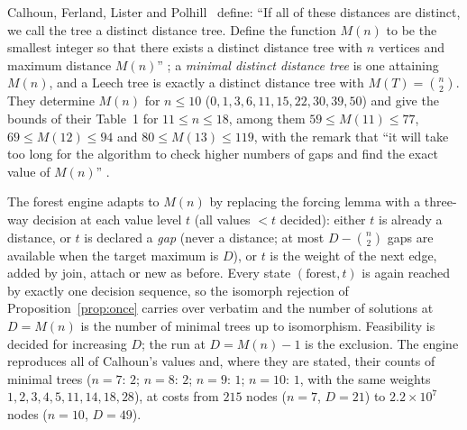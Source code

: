 \documentclass[11pt,a4paper]{article}
\theoremstyle{plain}
\theoremstyle{remark}
\newcommand{\bin}[2]{\binom{#1}{#2}}
\begin{document}
Calhoun, Ferland, Lister and Polhill~\cite{Calhoun2007} define: ``If all of
these distances are distinct, we call the tree a distinct distance tree.  Define
the function $M(n)$ to be the smallest integer so that there exists a distinct
distance tree with $n$ vertices and maximum distance $M(n)$'' \cite[p.~33]{Calhoun2007};
a \emph{minimal distinct distance tree} is one attaining $M(n)$, and a Leech tree
is exactly a distinct distance tree with $M(T)=\bin n2$.  They determine
$M(n)$ for $n\le 10$ ($0,1,3,6,11,15,22,30,39,50$) and give the bounds of their
Table~1 for $11\le n\le 18$, among them $59\le M(11)\le 77$, $69\le M(12)\le 94$
and $80\le M(13)\le 119$, with the remark that ``it will take too long for the
algorithm to check higher numbers of gaps and find the exact value of $M(n)$''
\cite[p.~44]{Calhoun2007}.

The forest engine adapts to $M(n)$ by replacing the forcing lemma with a
three-way decision at each value level $t$ (all values $<t$ decided): either $t$
is already a distance, or $t$ is declared a \emph{gap} (never a distance; at most
$D-\bin n2$ gaps are available when the target maximum is $D$), or $t$ is the
weight of the next edge, added by join, attach or new as before.  Every state
$(\text{forest},t)$ is again reached by exactly one decision sequence, so the
isomorph rejection of Proposition~\ref{prop:once} carries over verbatim and the
number of solutions at $D=M(n)$ is the number of minimal trees up to isomorphism.
Feasibility is decided for increasing $D$; the run at $D=M(n)-1$ is the
exclusion.  The engine reproduces all of Calhoun's values and, where they are
stated, their counts of minimal trees ($n=7$: $2$; $n=8$: $2$; $n=9$: $1$;
$n=10$: $1$, with the same weights $1,2,3,4,5,11,14,18,28$), at costs from $215$
nodes ($n=7$, $D=21$) to $2.2\times10^7$ nodes ($n=10$, $D=49$).
\end{document}
